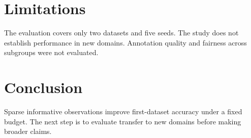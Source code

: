 \documentclass{article}
\begin{document}
\section{Limitations}
The evaluation covers only two datasets and five seeds. The study does not establish performance in new domains. Annotation quality and fairness across subgroups were not evaluated.
\section{Conclusion}
Sparse informative observations improve first-dataset accuracy under a fixed budget. The next step is to evaluate transfer to new domains before making broader claims.
\end{document}
